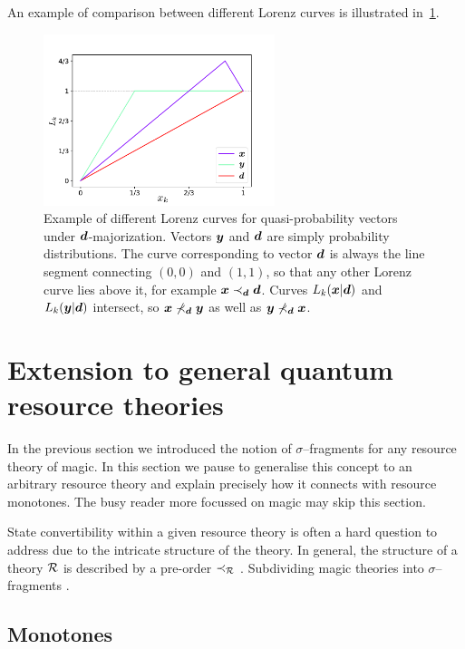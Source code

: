 \documentclass[pra,
aps,
twocolumn,
superscriptaddress,
groupedaddress,
nofootinbib,
reprint
]{revtex4-1}
\begin{document}
An example of comparison between different Lorenz curves is illustrated in~\cref{fig:lctoy}.
\begin{figure}
    \centering
    \includegraphics[height=5cm]{figs/lctoy.pdf}
    \caption{Example of different Lorenz curves for quasi-probability vectors under $\bm{d}$-majorization.
    Vectors $\bm{y}$ and $\bm{d}$ are simply probability distributions.
    The curve corresponding to vector $\bm{d}$ is always the line segment connecting $(0,0)$ and $(1,1)$, so that any other Lorenz curve lies above it, for example $\bm{x} \prec_{\bm{d}} \bm{d}$.
    Curves $L_k(\bm{x}|\bm{d})$ and $L_k(\bm{y}|\bm{d})$ intersect, so $\bm{x} \nprec_{\bm{d}} \bm{y}$ as well as $\bm{y} \nprec_{\bm{d}} \bm{x}$.
    }
    \label{fig:lctoy}
\end{figure}


\section{Extension to general quantum resource theories}
\label{sec:frag}

In the previous section we introduced the notion of $\sigma$--fragments for any resource theory of magic. In this section we pause to generalise this concept to an arbitrary resource theory and explain precisely how it connects with resource monotones. The busy reader more focussed on magic may skip this section.

State convertibility within a given resource theory is often a hard question to address due to the intricate structure of the theory.
In general, the structure of a theory $\mathcal{R}$ is described by a pre-order $\prec_{\mathcal{R}}$ .
Subdividing magic theories into $\sigma$--fragments .
\subsection{Monotones}\label{sec:mono}
\end{document}
